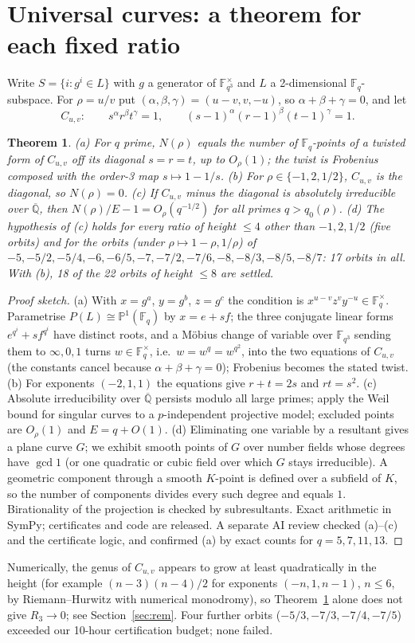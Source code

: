 \documentclass[11pt]{article}
\newtheorem{theorem}{Theorem}
\begin{document}
\section{Universal curves: a theorem for each fixed ratio}
Write $S=\{i:g^i\in L\}$ with $g$ a generator of $\mathbb F_{q^3}^\times$ and $L$ a 2-dimensional $\mathbb F_q$-subspace. For
$\rho=u/v$ put $(\alpha,\beta,\gamma)=(u-v,v,-u)$, so $\alpha+\beta+\gamma=0$, and let
\[C_{u,v}:\qquad s^\alpha r^\beta t^\gamma=1,\qquad (s-1)^\alpha(r-1)^\beta(t-1)^\gamma=1 .\]
\begin{theorem}\label{thm:curve}
(a) For $q$ prime, $N(\rho)$ equals the number of $\mathbb F_q$-points of a twisted form of $C_{u,v}$ off its diagonal $s=r=t$, up to
$O_\rho(1)$; the twist is Frobenius composed with the order-3 map $s\mapsto1-1/s$.
(b) For $\rho\in\{-1,2,1/2\}$, $C_{u,v}$ is the diagonal, so $N(\rho)=0$.
(c) If $C_{u,v}$ minus the diagonal is absolutely irreducible over $\overline{\mathbb Q}$, then $N(\rho)/E-1=O_\rho(q^{-1/2})$ for all
primes $q>q_0(\rho)$.
(d) The hypothesis of (c) holds for every ratio of height $\le4$ other than $-1,2,1/2$ (five orbits) and for the orbits (under $\rho\mapsto1-\rho,1/\rho$) of
$-5,-5/2,-5/4,-6,-6/5,-7,-7/2,-7/6,-8,-8/3,-8/5,-8/7$: 17 orbits in all. With (b), 18 of the 22 orbits of height $\le8$ are settled.
\end{theorem}
\begin{proof}[Proof sketch]
(a) With $x=g^a$, $y=g^b$, $z=g^c$ the condition is $x^{u-v}z^{v}y^{-u}\in\mathbb F_q^\times$. Parametrise $P(L)\cong\mathbb P^1(\mathbb F_q)$
by $x=e+sf$; the three conjugate linear forms $e^{q^i}+sf^{q^i}$ have distinct roots, and a M\"obius change of variable over
$\mathbb F_{q^3}$ sending them to $\infty,0,1$ turns $w\in\mathbb F_q^\times$, i.e.\ $w=w^q=w^{q^2}$, into the two equations of
$C_{u,v}$ (the constants cancel because $\alpha+\beta+\gamma=0$); Frobenius becomes the stated twist. (b) For exponents $(-2,1,1)$ the
equations give $r+t=2s$ and $rt=s^2$. (c) Absolute irreducibility over $\overline{\mathbb Q}$ persists modulo all large primes; apply the
Weil bound for singular curves \cite{AP} to a $p$-independent projective model; excluded points are $O_\rho(1)$ and $E=q+O(1)$.
(d) Eliminating one variable by a resultant gives a plane curve $G$; we exhibit smooth points of $G$ over number fields whose degrees
have $\gcd1$ (or one quadratic or cubic field over which $G$ stays irreducible). A geometric component through a smooth $K$-point is
defined over a subfield of $K$, so the number of components divides every such degree and equals $1$. Birationality of the projection
is checked by subresultants. Exact arithmetic in SymPy; certificates and code are released. A separate AI review checked (a)--(c)
and the certificate logic, and confirmed (a) by exact counts for $q=5,7,11,13$.
\end{proof}
Numerically, the genus of $C_{u,v}$ appears to grow at least quadratically in the height (for example $(n-3)(n-4)/2$ for exponents $(-n,1,n-1)$, $n\le6$,
by Riemann--Hurwitz with numerical monodromy), so Theorem~\ref{thm:curve} alone does not give $R_3\to0$; see Section~\ref{sec:rem}.
Four further orbits ($-5/3,-7/3,-7/4,-7/5$) exceeded our 10-hour certification budget; none failed.
\end{document}
